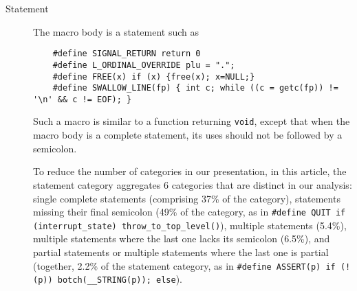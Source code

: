 \documentclass[10pt]{article}
\def\typeofdocument{article}    %
\begin{document}
\begin{description}
\item[Statement]\label{item:statement-category}
  The macro body is a statement such as
\begin{verbatim}
    #define SIGNAL_RETURN return 0
    #define L_ORDINAL_OVERRIDE plu = ".";
    #define FREE(x) if (x) {free(x); x=NULL;}
    #define SWALLOW_LINE(fp) { int c; while ((c = getc(fp)) != '\n' && c != EOF); }
\end{verbatim}
  Such a macro is similar to a function returning {\tt void}, except that when
  the macro body is a complete statement, its uses should not be followed
  by a semicolon.
    
  To reduce the number of categories in our presentation, in this
  \typeofdocument, the statement
  category aggregates 6 categories that are distinct in our analysis:
  single complete statements (comprising 37\% of the category), 
  statements missing their final semicolon (49\% of the category, as in
  {\tt \#define QUIT if (\verb|interrupt_state|)
  \verb|throw_to_top_level|()}), multiple statements (5.4\%), multiple
statements where the last one lacks its semicolon (6.5\%), and partial
statements or multiple statements where the last one is partial
(together, 2.2\% of the statement category, as in {\tt \#define
ASSERT(p) if (!(p)) botch(\verb|__STRING|(p)); else}).


\end{description}
\end{document}
